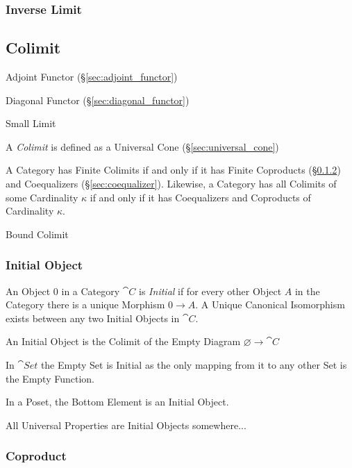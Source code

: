 \subsubsection{Inverse Limit}\label{sec:inverse_limit}



\subsection{Colimit} \label{sec:colimit}

Adjoint Functor (\S\ref{sec:adjoint_functor})

Diagonal Functor (\S\ref{sec:diagonal_functor})

Small Limit

A \emph{Colimit} is defined as a Universal Cone
(\S\ref{sec:universal_cone})

A Category has Finite Colimits if and only if it has Finite Coproducts
(\S\ref{sec:coproduct}) and Coequalizers (\S\ref{sec:coequalizer}).
Likewise, a Category has all Colimits of some Cardinality $\kappa$ if
and only if it has Coequalizers and Coproducts of Cardinality
$\kappa$.

Bound Colimit %



\subsubsection{Initial Object}\label{sec:initial_object}

An Object $0$ in a Category $\cat{C}$ is \emph{Initial} if for
every other Object $A$ in the Category there is a unique Morphism $0
\rightarrow A$. A Unique Canonical Isomorphism exists between any two
Initial Objects in $\cat{C}$.

An Initial Object is the Colimit of the Empty Diagram $\varnothing
\rightarrow \cat{C}$

In $\cat{Set}$ the Empty Set is Initial as the only mapping from it
to any other Set is the Empty Function.

In a Poset, the Bottom Element is an Initial Object.

All Universal Properties are Initial Objects somewhere...



\subsubsection{Coproduct}\label{sec:coproduct}

